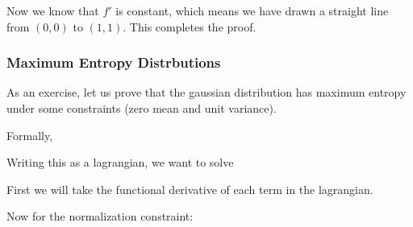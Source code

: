 \documentclass[12pt]{article}
\begin{document}
Now we know that $f'$ is constant, which means we have drawn a straight line from $(0,0)$ to $(1,1)$. This completes the proof.

\subsubsection{Maximum Entropy Distrbutions}

As an exercise, let us prove that the gaussian distribution has maximum entropy under some constraints (zero mean and unit variance). 

Formally, 

Writing this as a lagrangian, we want to solve

First we will take the functional derivative of each term in the lagrangian.

Now for the normalization constraint:
\end{document}
